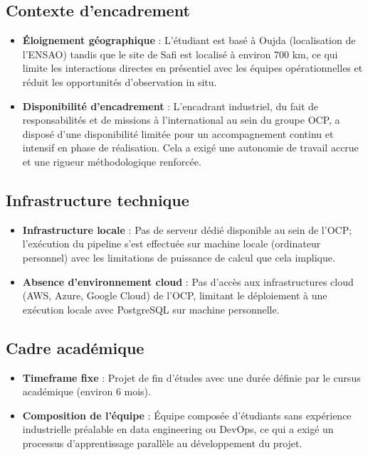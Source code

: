 \documentclass[a4paper,12pt,twoside]{report}
\begin{document}
\subsection{Contexte d'encadrement}

\begin{itemize}
    \item \textbf{Éloignement géographique} : L'étudiant est basé à Oujda (localisation de l'ENSAO) tandis que le site de Safi est localisé à environ 700 km, ce qui limite les interactions directes en présentiel avec les équipes opérationnelles et réduit les opportunités d'observation in situ.
    
    \item \textbf{Disponibilité d'encadrement} : L'encadrant industriel, du fait de responsabilités et de missions à l'international au sein du groupe OCP, a disposé d'une disponibilité limitée pour un accompagnement continu et intensif en phase de réalisation. Cela a exigé une autonomie de travail accrue et une rigueur méthodologique renforcée.
\end{itemize}

\subsection{Infrastructure technique}

\begin{itemize}
    \item \textbf{Infrastructure locale} : Pas de serveur dédié disponible au sein de l'OCP; l'exécution du pipeline s'est effectuée sur machine locale (ordinateur personnel) avec les limitations de puissance de calcul que cela implique.
    
    \item \textbf{Absence d'environnement cloud} : Pas d'accès aux infrastructures cloud (AWS, Azure, Google Cloud) de l'OCP, limitant le déploiement à une exécution locale avec PostgreSQL sur machine personnelle.
\end{itemize}

\subsection{Cadre académique}

\begin{itemize}
    \item \textbf{Timeframe fixe} : Projet de fin d'études avec une durée définie par le cursus académique (environ 6 mois).
    
    \item \textbf{Composition de l'équipe} : Équipe composée d'étudiants sans expérience industrielle préalable en data engineering ou DevOps, ce qui a exigé un processus d'apprentissage parallèle au développement du projet.
\end{itemize}
\end{document}
